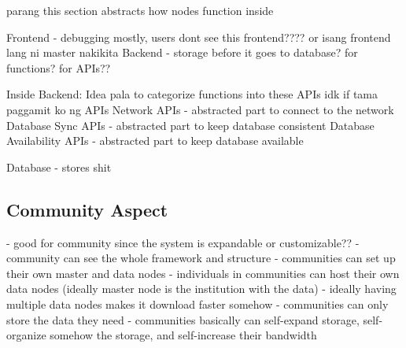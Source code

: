 \documentclass[acmsmall]{acmart}
\begin{document}
parang this section abstracts how nodes function inside

Frontend - debugging mostly, users dont see this frontend???? or isang frontend lang ni master nakikita
Backend - storage before it goes to database? for functions? for APIs??
 
Inside Backend: Idea pala to categorize functions into these APIs idk if tama paggamit ko ng APIs
Network APIs - abstracted part to connect to the network
Database Sync APIs - abstracted part to keep database consistent
Database Availability APIs - abstracted part to keep database available


Database - stores shit


\subsection{Community Aspect}
- good for community since the system is expandable or customizable??
- community can see the whole framework and structure
- communities can set up their own master and data nodes
- individuals in communities can host their own data nodes (ideally master node is the institution with the data)
- ideally having multiple data nodes makes it download faster somehow
- communities can only store the data they need
- communities basically can self-expand storage, self-organize somehow the storage, and self-increase their bandwidth 
\end{document}
